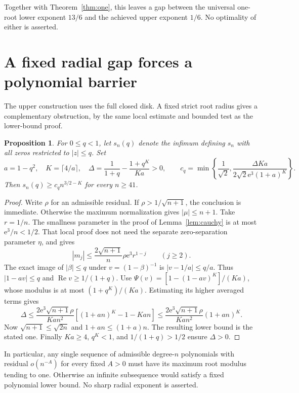 \documentclass[11pt]{article}
\newtheorem{proposition}[theorem]{Proposition}
\theoremstyle{remark}\newtheorem{remark}[theorem]{Remark}
\newcommand{\Rea}{\operatorname{Re}}
\newcommand{\ee}{\mathrm e}
\begin{document}
Together with Theorem~\ref{thm:one}, this leaves a gap between
the universal one-root lower exponent \(13/6\) and the achieved
upper exponent \(1/6\). No optimality of either is asserted.

\section{A fixed radial gap forces a polynomial barrier}\label{sec:radial}
The upper construction uses the full closed disk. A fixed strict
root radius gives a complementary obstruction, by the same local
estimate and bounded test as the lower-bound proof.

\begin{proposition}\label{prop:radial}
For \(0\le q<1\), let \(s_n(q)\) denote the infimum defining \(s_n\)
with all zeros restricted to \(|z|\le q\). Set
\[
 a=1-q^2,\quad K=\lceil4/a\rceil,\quad
 \Delta=\frac1{1+q}-\frac{1+q^K}{Ka}>0,\qquad
 c_q=\min\left\{\frac1{\sqrt2},
       \frac{\Delta Ka}{2\sqrt2\ee^3(1+a)^K}\right\}.
\]
Then \(s_n(q)\ge c_q n^{3/2-K}\) for every \(n\ge41\).
\end{proposition}
\begin{proof}
Write \(\rho\) for an admissible residual. If
\(\rho>1/\sqrt{n+1}\), the conclusion is immediate.
Otherwise the maximum normalization gives \(|\mu|\le n+1\).
Take \(r=1/n\). The smallness parameter in the proof of
Lemma~\ref{lem:cauchy} is at most \(\ee^3/n<1/2\).
That local proof does not need the separate zero-separation
parameter \(\eta\), and gives
\[
 |m_j|\le\frac{2\sqrt{n+1}}n\rho\ee^3 r^{1-j}\qquad(j\ge2).
\]
The exact image of \(|\beta|\le q\) under \(v=(1-\beta)^{-1}\)
is \(|v-1/a|\le q/a\). Thus \(|1-av|\le q\) and
\(\Rea v\ge1/(1+q)\).
Use \(\Psi(v)=[1-(1-av)^K]/(Ka)\), whose modulus is at most
\((1+q^K)/(Ka)\). Estimating its higher averaged terms gives
\[
 \Delta\le\frac{2\ee^3\sqrt{n+1}\rho}{Kan^2}
       [(1+an)^K-1-Kan]
 \le\frac{2\ee^3\sqrt{n+1}\rho}{Kan^2}(1+an)^K.
\]
Now \(\sqrt{n+1}\le\sqrt{2n}\) and \(1+an\le(1+a)n\).
The resulting lower bound is the stated one. Finally \(Ka\ge4\),
\(q^K<1\), and \(1/(1+q)>1/2\) ensure \(\Delta>0\).
\end{proof}

In particular, any single sequence of admissible degree-\(n\)
polynomials with residual \(o(n^{-A})\) for every fixed \(A>0\)
must have its maximum root modulus tending to one. Otherwise an
infinite subsequence would satisfy a fixed polynomial lower bound.
No sharp radial exponent is asserted.
\end{document}

